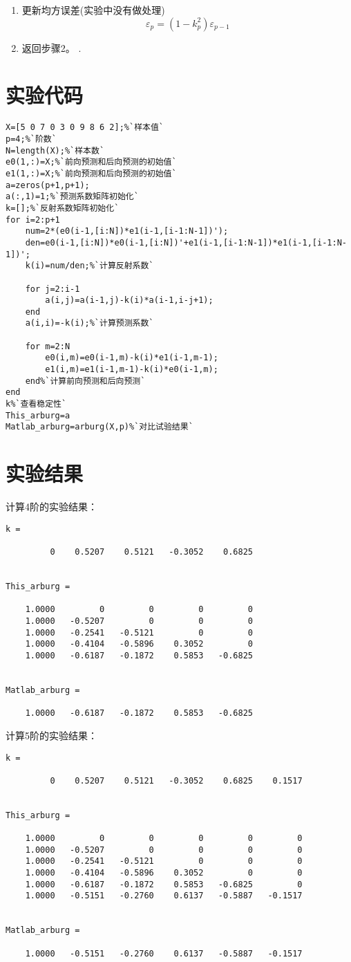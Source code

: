 \documentclass[11pt,a4paper]{ctexart}
\begin{document}
\begin{enumerate}
\item 更新均方误差(实验中没有做处理)
\begin{displaymath}
\varepsilon_{p} = (1-k^{2}_{p})\varepsilon_{p-1}
\end{displaymath}

\item 返回步骤2。
.\end{enumerate}

\section{实验代码}
\begin{lstlisting}
X=[5 0 7 0 3 0 9 8 6 2];%`样本值`
p=4;%`阶数`
N=length(X);%`样本数`
e0(1,:)=X;%`前向预测和后向预测的初始值`
e1(1,:)=X;%`前向预测和后向预测的初始值`
a=zeros(p+1,p+1);
a(:,1)=1;%`预测系数矩阵初始化`
k=[];%`反射系数矩阵初始化`
for i=2:p+1
    num=2*(e0(i-1,[i:N])*e1(i-1,[i-1:N-1])');
    den=e0(i-1,[i:N])*e0(i-1,[i:N])'+e1(i-1,[i-1:N-1])*e1(i-1,[i-1:N-1])';
    k(i)=num/den;%`计算反射系数`

    for j=2:i-1
        a(i,j)=a(i-1,j)-k(i)*a(i-1,i-j+1);
    end
    a(i,i)=-k(i);%`计算预测系数`

    for m=2:N
        e0(i,m)=e0(i-1,m)-k(i)*e1(i-1,m-1);
        e1(i,m)=e1(i-1,m-1)-k(i)*e0(i-1,m);
    end%`计算前向预测和后向预测`
end
k%`查看稳定性`
This_arburg=a
Matlab_arburg=arburg(X,p)%`对比试验结果`
\end{lstlisting}

\section{实验结果}
计算4阶的实验结果：
\begin{lstlisting}
k =

         0    0.5207    0.5121   -0.3052    0.6825


This_arburg =

    1.0000         0         0         0         0
    1.0000   -0.5207         0         0         0
    1.0000   -0.2541   -0.5121         0         0
    1.0000   -0.4104   -0.5896    0.3052         0
    1.0000   -0.6187   -0.1872    0.5853   -0.6825


Matlab_arburg =

    1.0000   -0.6187   -0.1872    0.5853   -0.6825
\end{lstlisting}

计算5阶的实验结果：
\begin{lstlisting}
k =

         0    0.5207    0.5121   -0.3052    0.6825    0.1517


This_arburg =

    1.0000         0         0         0         0         0
    1.0000   -0.5207         0         0         0         0
    1.0000   -0.2541   -0.5121         0         0         0
    1.0000   -0.4104   -0.5896    0.3052         0         0
    1.0000   -0.6187   -0.1872    0.5853   -0.6825         0
    1.0000   -0.5151   -0.2760    0.6137   -0.5887   -0.1517


Matlab_arburg =

    1.0000   -0.5151   -0.2760    0.6137   -0.5887   -0.1517
\end{lstlisting}
\end{document}
